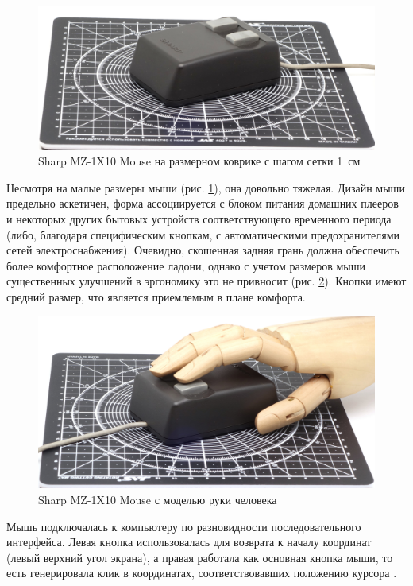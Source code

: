 \documentclass[11pt, a4paper]{article}
\begin{document}
\begin{figure}[h]
    \centering
    \includegraphics[scale=0.5]{1983_sharp_mz_1x10_mouse/size_30.jpg}
    \caption{Sharp MZ-1X10 Mouse на размерном коврике с шагом сетки 1~см}
    \label{fig:SharpMZ1x10Size}
\end{figure}

Несмотря на малые размеры мыши (рис. \ref{fig:SharpMZ1x10Size}), она довольно тяжелая. Дизайн мыши предельно аскетичен, форма ассоциируется с блоком питания домашних плееров и некоторых других бытовых устройств соответствующего временного периода (либо, благодаря специфическим кнопкам, с автоматическими предохранителями сетей электроснабжения). Очевидно, скошенная задняя грань должна обеспечить более комфортное расположение ладони, однако с учетом размеров мыши существенных улучшений в эргономику это не привносит (рис. \ref{fig:SharpMZ1x10Hand}). Кнопки имеют средний размер, что является приемлемым в плане комфорта.

\begin{figure}[h]
    \centering
    \includegraphics[scale=0.5]{1983_sharp_mz_1x10_mouse/hand_30.jpg}
    \caption{Sharp MZ-1X10 Mouse с моделью руки человека}
    \label{fig:SharpMZ1x10Hand}
\end{figure}

Мышь подключалась к компьютеру по разновидности последовательного интерфейса. Левая кнопка использовалась для возврата к началу координат (левый верхний угол экрана), а правая работала как основная кнопка мыши, то есть генерировала клик в координатах, соответствовавших положению курсора \cite{manual}.
\end{document}
